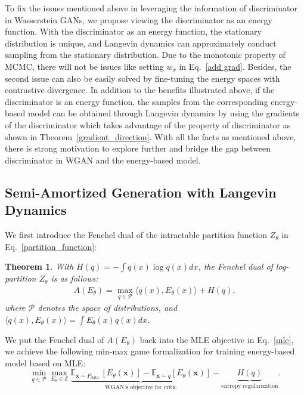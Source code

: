 \documentclass{article}
\newtheorem{theorem}{Theorem}
\begin{document}
To fix the issues mentioned above in leveraging the information of discriminator in Wasserstein GANs, we propose viewing the discriminator as an energy function. With the discriminator as an energy function, the stationary distribution is unique, and Langevin dynamics can approximately conduct sampling from the stationary distribution. Due to the monotonic property of MCMC, there will not be issues like setting $w_x$ in Eq.~\ref{add grad}. Besides, the second issue can also be easily solved by fine-tuning the energy spaces with contrastive divergence.  In addition to the benefits illustrated above, if the discriminator is an energy function, the samples from the corresponding energy-based model can be obtained through Langevin dynamics by using the gradients of the discriminator which takes advantage of the  property of discriminator as shown in Theorem~\ref{gradient_direction}. With all the facts as mentioned above, there is strong motivation to explore further and bridge the gap between discriminator in WGAN and the energy-based model. 

\subsection{Semi-Amortized Generation with Langevin Dynamics}
\label{sec::energyofcritic}
We first introduce the Fenchel dual of the intractable partition function $Z_\theta$ in Eq.~\ref{partition_function}:
\begin{theorem}\cite{wainwright2008graphical}
    With $H(q) = - \int q(x)\log q(x) dx$, the Fenchel dual of log-partition $Z_\theta$ is as follows:
    \begin{align}
        A(E_\theta)=\max _{q \in \mathcal{P}}\langle q(x), E_\theta(x)\rangle+ H(q),
    \end{align}
    where $\mathcal{P}$ denotes the space of distributions, and $\langle q(x), E_\theta(x)\rangle =\int  E_\theta(x)q(x) dx $.
\end{theorem}
We put the Fenchel dual of $A(E_\theta)$ back into the MLE objective in Eq.~\ref{mle}, we achieve the following min-max game formalization for training energy-based model based on MLE:
\begin{equation}
    \label{fenchel_mle}
     \min _{q \in \mathcal{P}} \max _{E_\theta \in \mathcal{E}} \underbrace{\mathbb{E}_{\boldsymbol{x} \sim P_{\text {data }}}\left[E_\theta(\boldsymbol{x})\right]-\mathbb{E}_{\boldsymbol{x} \sim q}\left[E_\theta(\boldsymbol{x})\right]}_\text{WGAN's objective for critic} -\underbrace{H(q)}_{\text{entropy regularization}}.
\end{equation}
\end{document}
